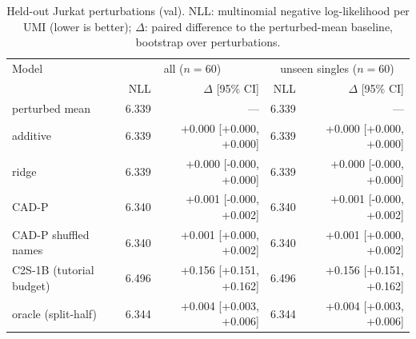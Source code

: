 \begin{table}[t]
\centering
\scriptsize
\setlength{\tabcolsep}{3pt}
\begin{tabular}{lrrrr}
\toprule
Model & \multicolumn{2}{c}{all ($n=60$)} & \multicolumn{2}{c}{unseen singles ($n=60$)} \\
 & NLL & $\Delta$ [95\% CI] & NLL & $\Delta$ [95\% CI] \\
\midrule
perturbed mean & 6.339 & --- & 6.339 & --- \\
additive & 6.339 & +0.000 [+0.000, +0.000] & 6.339 & +0.000 [+0.000, +0.000] \\
ridge & 6.339 & +0.000 [-0.000, +0.000] & 6.339 & +0.000 [-0.000, +0.000] \\
CAD-P & 6.340 & +0.001 [-0.000, +0.002] & 6.340 & +0.001 [-0.000, +0.002] \\
CAD-P shuffled names & 6.340 & +0.001 [+0.000, +0.002] & 6.340 & +0.001 [+0.000, +0.002] \\
C2S-1B (tutorial budget) & 6.496 & +0.156 [+0.151, +0.162] & 6.496 & +0.156 [+0.151, +0.162] \\
oracle (split-half) & 6.344 & +0.004 [+0.003, +0.006] & 6.344 & +0.004 [+0.003, +0.006] \\
\bottomrule
\end{tabular}
\caption{Held-out Jurkat perturbations (val). NLL: multinomial negative log-likelihood per UMI (lower is better); $\Delta$: paired difference to the perturbed-mean baseline, bootstrap over perturbations.}
\label{tab:jurkat-val}
\end{table}